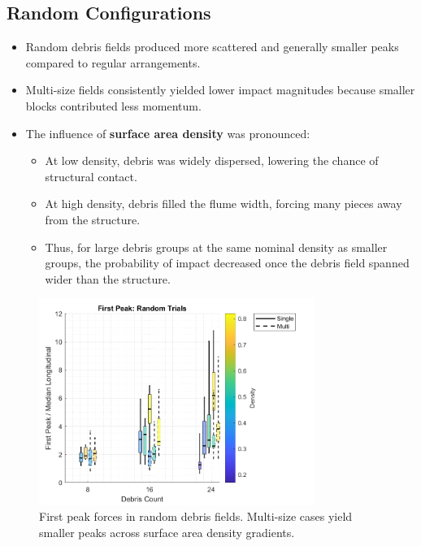 \documentclass{article}
\begin{document}
\subsection{Random Configurations}
\begin{itemize}
    \item Random debris fields produced more scattered and generally smaller peaks compared to regular arrangements.
    \item Multi-size fields consistently yielded lower impact magnitudes because smaller blocks contributed less momentum.
    \item The influence of \textbf{surface area density} was pronounced:
    \begin{itemize}
        \item At low density, debris was widely dispersed, lowering the chance of structural contact.
        \item At high density, debris filled the flume width, forcing many pieces away from the structure.
        \item Thus, for large debris groups at the same nominal density as smaller groups, the probability of impact decreased once the debris field spanned wider than the structure.
    \end{itemize}
\end{itemize}

\begin{figure}[htbp]
    \centering
    \includegraphics[width=0.8\textwidth]{First_Peak_Random_Single_vs_Multi_ByDensityGradient.png}
    \caption{First peak forces in random debris fields. Multi-size cases yield smaller peaks across surface area density gradients.}
    \label{fig:random_peaks_first}
\end{figure}
\end{document}
